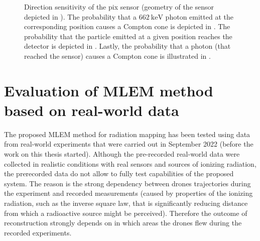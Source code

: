 \begin{figure}[!htb]
  \caption{Direction sensitivity of the \ac{pix} sensor (geometry of the sensor depicted in \protect{}). 
  The probability that a $\SI{662}{\kilo\electronvolt}$ photon emitted at the corresponding position causes a Compton cone is depicted in \protect{}. 
  The probability that the particle emitted at a given position reaches the detector is depicted in \protect{}. 
  Lastly, the probability that a photon (that reached the sensor) causes a Compton cone is illustrated in \protect{}.}
  \label{fig:monte_clar}
\end{figure}%
\newpage
\section{Evaluation of MLEM method based on real-world data\label{chap:exp1}}
The proposed \ac{MLEM} method for radiation mapping has been tested using data from real-world experiments that were carried out in September 2022 (before the work on this thesis started).
Although the pre-recorded real-world data were collected in realistic conditions with real sensors and sources of ionizing radiation, the prerecorded data do not allow to fully test capabilities of the proposed system.
The reason is the strong dependency between drones trajectories during the experiment and recorded measurements (caused by properties of the ionizing radiation, such as the inverse square law, that is significantly reducing distance from which a radioactive source might be perceived). 
Therefore the outcome of reconstruction strongly depends on in which areas the drones flew during the recorded experiments.

